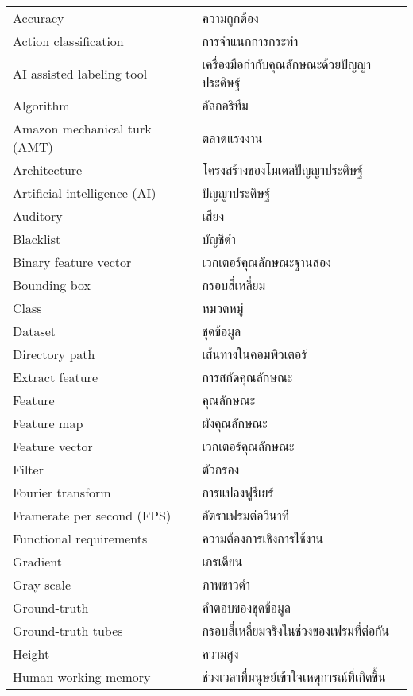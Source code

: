 \begin{abbreviations}
    \noindent
    \begin{tabular*}{\textwidth}{@{}p{}p{}@{}}
	Accuracy     &   ความถูกต้อง\\
        Action classification  &  การจำแนกการกระทำ\\
        AI assisted labeling tool  &   เครื่องมือกำกับคุณลักษณะด้วยปัญญาประดิษฐ์\\
	Algorithm   &     อัลกอริทึม\\
        Amazon mechanical turk (AMT) & ตลาดแรงงาน\\
	Architecture  &  โครงสร้างของโมเดลปัญญาประดิษฐ์\\
	Artificial intelligence (AI) &           ปัญญาประดิษฐ์\\
        Auditory  &      เสียง\\
	Blacklist    &    บัญชีดำ\\
        Binary feature vector & เวกเตอร์คุณลักษณะฐานสอง\\
	Bounding box  &  กรอบสี่เหลี่ยม\\
        Class        &    หมวดหมู่\\
        Dataset   &      ชุดข้อมูล\\
	Directory path &   เส้นทางในคอมพิวเตอร์\\
        Extract feature & การสกัดคุณลักษณะ \\
        Feature     &    คุณลักษณะ\\
        Feature map  &  ผังคุณลักษณะ\\
        Feature vector  &  เวกเตอร์คุณลักษณะ\\
        Filter & ตัวกรอง\\
        Fourier transform &  การแปลงฟูรีเยร์\\
        Framerate per second (FPS) & อัตราเฟรมต่อวินาที \\
        Functional requirements & ความต้องการเชิงการใช้งาน\\
        Gradient    &    เกรเดียน\\
        Gray scale     &   ภาพขาวดำ\\
        Ground-truth &   คำตอบของชุดข้อมูล\\        
	Ground-truth tubes & กรอบสี่เหลี่ยมจริงในช่วงของเฟรมที่ต่อกัน\\
        Height     &   ความสูง\\
	Human working memory & ช่วงเวลาที่มนุษย์เข้าใจเหตุการณ์ที่เกิดขึ้น\\

\end{tabular*}
\end{abbreviations}
